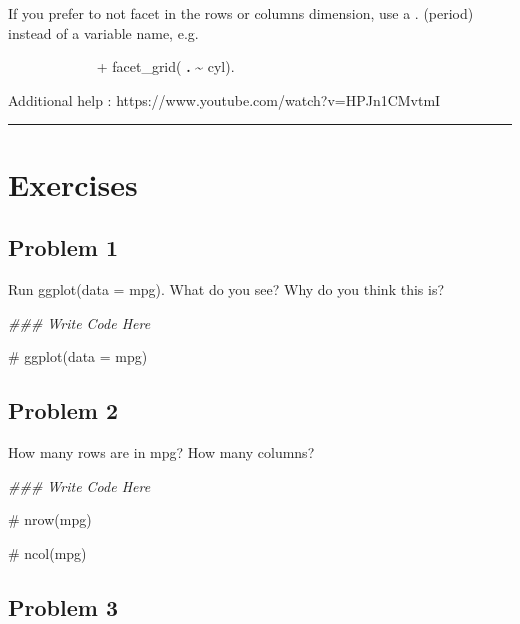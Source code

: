 \documentclass[
  letterpaper,
  DIV=11,
  numbers=noendperiod]{scrreprt}
\newenvironment{Shaded}{\begin{snugshade}}{\end{snugshade}}
\newcommand{\CommentTok}[1]{\textcolor[rgb]{0.37,0.37,0.37}{#1}}
\newcommand{\DocumentationTok}[1]{\textcolor[rgb]{0.37,0.37,0.37}{\textit{#1}}}
\begin{document}
If you prefer to not facet in the rows or columns dimension, use a \(.\)
(period) instead of a variable name, e.g.~

\(\hspace{1in}\) + facet\_grid( \textbf{.} \textasciitilde{} cyl).

Additional help : https://www.youtube.com/watch?v=HPJn1CMvtmI

\begin{center}\rule{0.5\linewidth}{0.5pt}\end{center}

\section*{Exercises}\label{exercises-6}


\subsection*{Problem 1}\label{problem-1-1}

Run ggplot(data = mpg). What do you see? Why do you think this is?

\begin{Shaded}
\begin{Highlighting}[]
\DocumentationTok{\#\#\# Write Code Here}

\CommentTok{\# ggplot(data = mpg)}
\end{Highlighting}
\end{Shaded}

\subsection*{Problem 2}\label{problem-2-1}

How many rows are in mpg? How many columns?

\begin{Shaded}
\begin{Highlighting}[]
\DocumentationTok{\#\#\# Write Code Here}

\CommentTok{\# nrow(mpg)}

\CommentTok{\# ncol(mpg)}
\end{Highlighting}
\end{Shaded}

\subsection*{Problem 3}\label{problem-3-1}
\end{document}
